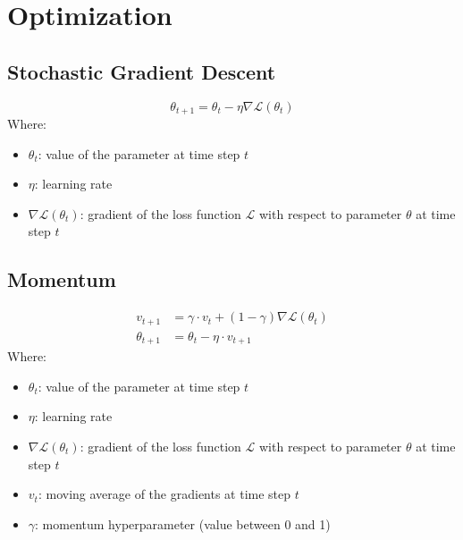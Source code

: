 \documentclass[a4paper]{article}
\newcommand{\ELL}{\mathcal{L}}
\begin{document}
\pagebreak
\section*{Optimization}

\subsection*{Stochastic Gradient Descent}
\begin{equation*}
    \theta_{t+1} = \theta_t - \eta \nabla\ELL(\theta_t)
\end{equation*}
Where:
\begin{itemize}
    \item $\theta_t$: value of the parameter at time step $t$
    \item $\eta$: learning rate
    \item $\nabla\ELL(\theta_t)$: gradient of the loss function $\ELL$ with respect to parameter $\theta$ at time step $t$
\end{itemize}

\subsection*{Momentum}
\begin{align*}
    v_{t+1}      &= \gamma \cdot v_t + (1-\gamma) \nabla\ELL(\theta_t) \\
    \theta_{t+1} &= \theta_t - \eta \cdot v_{t+1}
\end{align*}
Where:
\begin{itemize}
    \item $\theta_t$: value of the parameter at time step $t$
    \item $\eta$: learning rate
    \item $\nabla\ELL(\theta_t)$: gradient of the loss function $\ELL$ with respect to parameter $\theta$ at time step $t$
    \item $v_t$: moving average of the gradients at time step $t$
    \item $\gamma$: momentum hyperparameter (value between 0 and 1)
\end{itemize}
\end{document}
